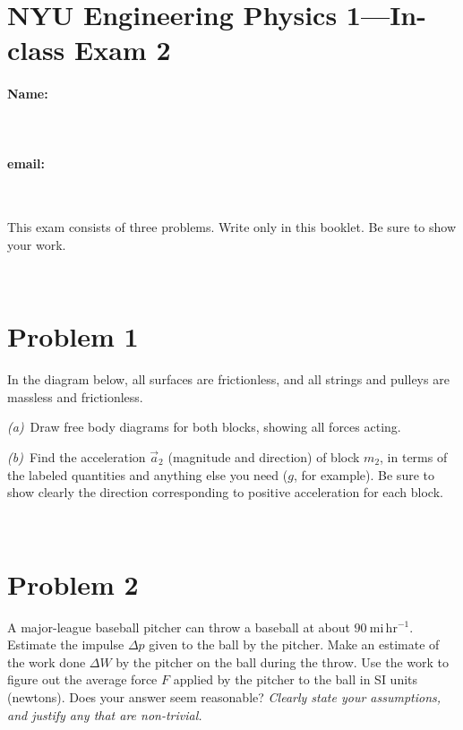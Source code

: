 \documentclass[12pt]{article}
\begin{document}
\section*{NYU Engineering Physics 1---In-class Exam 2}

\vfill

\paragraph{Name:} ~

\paragraph{email:} ~

\vfill

This exam consists of three problems.  Write only in this booklet.  Be
sure to show your work.

\vfill ~

\clearpage

\section*{Problem 1}

In the diagram below, all surfaces are frictionless, and all strings
and pulleys are massless and frictionless.
\\

\textsl{(a)}~Draw free body diagrams for both blocks, showing all
forces acting.

\vfill

\textsl{(b)}~Find the acceleration $\vec{a}_2$ (magnitude and
direction) of block $m_2$, in terms of the labeled quantities and
anything else you need ($g$, for example).  Be sure to show clearly
the direction corresponding to positive acceleration for each block.

\vfill ~

\clearpage

\section*{Problem 2}

A major-league baseball pitcher can throw a baseball at about
$90~\mathrm{mi\,hr^{-1}}$.  Estimate the impulse $\Delta p$ given to
the ball by the pitcher.  Make an estimate of the work done $\Delta W$
by the pitcher on the ball during the throw.  Use the work to figure
out the average force $F$ applied by the pitcher to the ball in SI
units (newtons).  Does your answer seem reasonable?  \emph{Clearly
state your assumptions, and justify any that are non-trivial.}
\end{document}
